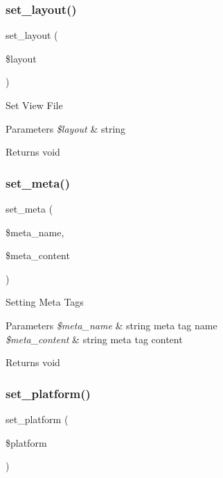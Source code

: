 \subsubsection{\texorpdfstring{set\+\_\+layout()}{set\_layout()}}
{\footnotesize\ttfamily set\+\_\+layout (\begin{DoxyParamCaption}\item[{}]{\$layout }\end{DoxyParamCaption})}

Set View File 
\begin{DoxyParams}{Parameters}
{\em \$layout} & string \\
\hline
\end{DoxyParams}
\begin{DoxyReturn}{Returns}
void 
\end{DoxyReturn}
\mbox{\label{class_template_a8808eee4df738b9e726281967f1e90b7}} 
\subsubsection{\texorpdfstring{set\+\_\+meta()}{set\_meta()}}
{\footnotesize\ttfamily set\+\_\+meta (\begin{DoxyParamCaption}\item[{}]{\$meta\+\_\+name,  }\item[{}]{\$meta\+\_\+content }\end{DoxyParamCaption})}

Setting Meta Tags 
\begin{DoxyParams}{Parameters}
{\em \$meta\+\_\+name} & string meta tag name \\
\hline
{\em \$meta\+\_\+content} & string meta tag content \\
\hline
\end{DoxyParams}
\begin{DoxyReturn}{Returns}
void 
\end{DoxyReturn}
\mbox{\label{class_template_aac02489372aef6eb2e074c8c2123ecd5}} 
\subsubsection{\texorpdfstring{set\+\_\+platform()}{set\_platform()}}
{\footnotesize\ttfamily set\+\_\+platform (\begin{DoxyParamCaption}\item[{}]{\$platform }\end{DoxyParamCaption})}


